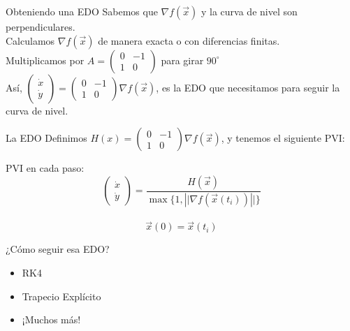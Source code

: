 \documentclass[fleqn]{beamer}\usepackage[]{graphicx}\usepackage[]{xcolor}
\begin{document}
\begin{frame}{Obteniendo una EDO}
    Sabemos que $\nabla f(\vec{x})$ y la curva de nivel son perpendiculares.\\
    \vspace{10 pt}
    Calculamos $\nabla f(\vec{x})$ de manera exacta o con diferencias finitas.\\
   \vspace{ 10pt}
   Multiplicamos por $A = \begin{pmatrix}
   0 & -1 \\
   1 & 0
   \end{pmatrix}$ para girar $90^{\circ}$\\
   \vspace{ 10pt}
    Así, $\begin{pmatrix}
    \dot{x} \\
    \dot{y}
    \end{pmatrix}
    =
    \begin{pmatrix}
   0 & -1 \\
   1 & 0
   \end{pmatrix} \nabla f(\vec{x})$, es la EDO que necesitamos para seguir la curva de nivel.
\end{frame}

\begin{frame}{La EDO}
   Definimos $H(x) = \begin{pmatrix}
   0 & -1 \\
   1 & 0
   \end{pmatrix} \nabla f(\vec{x})$, y tenemos el siguiente PVI:\\
   \vspace{10 pt}
   \begin{block}{PVI en cada paso:}
   $$\begin{pmatrix}
    \dot{x} \\
    \dot{y}
    \end{pmatrix}
    =
    \frac{H(\vec{x})}{\max\{1,\left|| \nabla f(\vec{x}(t_i))\right||\}}$$\\
    \vspace{3 pt}
    $$\vec{x}(0) = \vec{x}(t_i)$$
   \end{block}
\end{frame}

\begin{frame}{¿Cómo seguir esa EDO?}
    \begin{itemize}
        \item RK4
        \item Trapecio Explícito
        \item ¡Muchos más!
    \end{itemize}
\end{frame}
\end{document}
